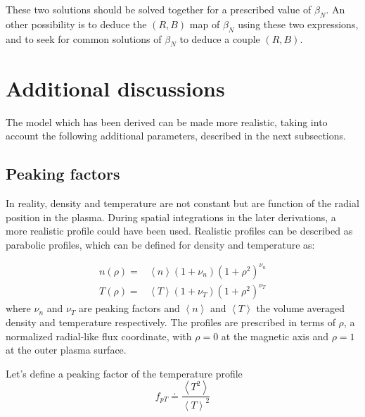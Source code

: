 These two solutions should be solved together for a prescribed value of $\beta_N$. An other possibility is to deduce the $(R,B)$ map of $\beta_N$ using these two expressions, and to seek for common solutions of $\beta_N$ to deduce a couple $(R,B)$.

 

\section{Additional discussions}
The model which has been derived can be made more realistic, taking into account the following additional parameters, described in the next subsections.


\subsection{Peaking factors}
In reality, density and temperature are not constant but are function of the radial position in the plasma. During spatial integrations in the later derivations, a more realistic profile could have been used. Realistic profiles can be described as parabolic profiles, which can be defined for density and temperature as:

\begin{align}
	n(\rho)
	=&
	\left< n \right>
	\left(1 + \nu_n \right)
	\left(1 + \rho^2 \right)^{\nu_n}
	\\
	T(\rho)
	=&
	\left< T \right>
	\left(1 + \nu_T \right)
	\left(1 + \rho^2 \right)^{\nu_T}
\end{align}
where $\nu_n$ and $\nu_T$ are peaking factors and $\left< n \right>$ and $\left< T \right>$ the volume averaged density 
and temperature respectively. The profiles are prescribed in terms of $\rho$, a normalized radial-like flux coordinate, with $\rho=0$  at the magnetic axis and $\rho=1$ at the outer plasma surface.

Let's define a peaking factor of the temperature profile
\begin{equation}
	f_{pT}
	\doteq
	\frac{\left< T^2 \right>}{\left< T \right>^2}
\end{equation}


